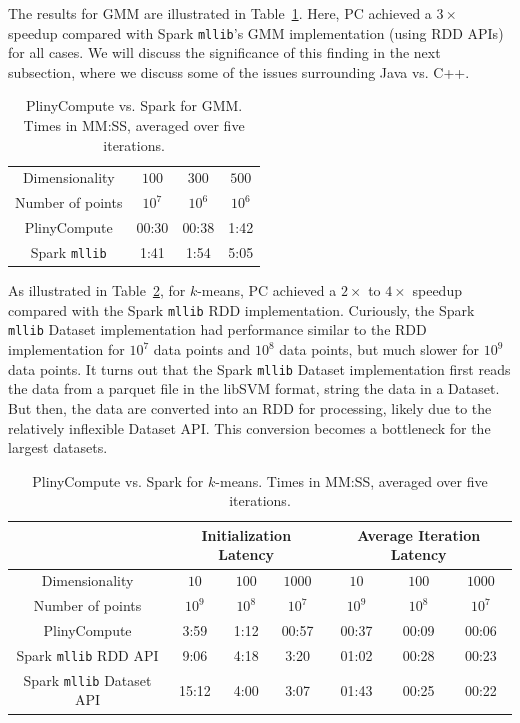 The results for GMM are illustrated in Table~\ref{fig:Gmm}. Here, PC achieved a 
$3\times$ speedup compared with Spark \texttt{mllib}'s GMM implementation
(using RDD APIs) for all cases.  We will discuss the significance of this finding in the next subsection, where we discuss
some of the issues surrounding Java vs. C++.  

\begin{table}[h!]
\begin{center}
\begin{tabular}{|c||c|c|c||}
\hline
Dimensionality & $100$ & $300$ & $500$ \\
Number of points & $10^7$ & $10^6$ & $10^6$ \\
\hline
\hline
PlinyCompute &00:30 & 00:38 & 1:42 \\
Spark \texttt{mllib} &1:41  &1:54 &5:05 \\
\hline
\end{tabular}
\caption{PlinyCompute vs. Spark for GMM. Times in MM:SS, averaged over five iterations.}
\label{fig:Gmm}
\end{center}
\end{table}



As illustrated in Table~\ref{fig:KMeans}, for $k$-means, PC achieved a $2\times$ to
$4\times$ speedup compared with the Spark \texttt{mllib} RDD implementation.
Curiously, the Spark \texttt{mllib} Dataset implementation
had performance similar to the RDD implementation for
$10^7$ data points and $10^8$ data
points, but much slower for $10^9$ data points. It turns out that 
the Spark \texttt{mllib} Dataset implementation first reads the data 
from a parquet file in the libSVM format, string the data in a Dataset.  But then, the data
are converted into an RDD for processing, likely due to the relatively inflexible Dataset API.
This conversion becomes a bottleneck for the largest datasets.

\begin{table}[h!]
\begin{center}
\begin{tabular}{|c||c|c|c||c|c|c||}
\hline
& \multicolumn{3}{c||}{Initialization Latency} & \multicolumn{3}{c||}{Average
                                         Iteration Latency} \\
\hline
Dimensionality & $10$ & $100$ & $1000$ & $10$ & $100$ & $1000$\\
Number of points & $10^9$ & $10^8$ & $10^7$ & $10^9$ & $10^8$ & $10^7$\\
\hline
PlinyCompute &3:59 & 1:12 & 00:57 &00:37 & 00:09 & 00:06\\
Spark \texttt{mllib} RDD API &9:06  &4:18 &3:20 &01:02 & 00:28 & 00:23\\
Spark \texttt{mllib} Dataset API &15:12  &4:00 &3:07 &01:43 & 00:25 & 00:22\\
\hline
\end{tabular}
\caption{PlinyCompute vs. Spark for $k$-means. Times in MM:SS, averaged over five iterations.}
\label{fig:KMeans}
\end{center}
\end{table}


